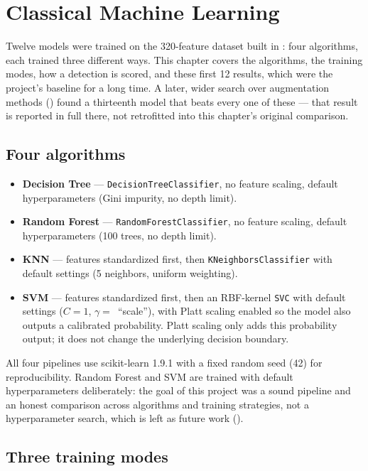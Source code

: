 \chapter{Classical Machine Learning}
\label{chap:classicalml}

Twelve models were trained on the 320-feature dataset built in : four
algorithms, each trained three different ways. This chapter covers the algorithms, the training
modes, how a detection is scored, and these first 12 results, which were the project's baseline
for a long time. A later, wider search over augmentation methods ()
found a thirteenth model that beats every one of these --- that result is reported in full
there, not retrofitted into this chapter's original comparison.

\section{Four algorithms}

\begin{itemize}[leftmargin=1.4em]
  \item \textbf{Decision Tree} --- \texttt{DecisionTreeClassifier}, no feature scaling, default
    hyperparameters (Gini impurity, no depth limit).
  \item \textbf{Random Forest} --- \texttt{RandomForestClassifier}, no feature scaling, default
    hyperparameters (100 trees, no depth limit).
  \item \textbf{KNN} --- features standardized first, then \texttt{KNeighborsClassifier} with
    default settings (5 neighbors, uniform weighting).
  \item \textbf{SVM} --- features standardized first, then an RBF-kernel \texttt{SVC} with
    default settings (\(C = 1\), \(\gamma = \)~``scale''), with Platt scaling enabled so the
    model also outputs a calibrated probability. Platt scaling only adds this probability
    output; it does not change the underlying decision boundary.
\end{itemize}

All four pipelines use scikit-learn 1.9.1 with a fixed random seed (42) for reproducibility.
Random Forest and SVM are trained with default hyperparameters deliberately: the goal of this
project was a sound pipeline and an honest comparison across algorithms and training strategies,
not a hyperparameter search, which is left as future work ().

\section{Three training modes}

